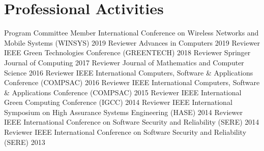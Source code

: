 \section{Professional Activities}
\begin{cvhonors}
  \cvhonor
    {Program Committee Member}
    {International Conference on Wireless Networks and Mobile Systems (WINSYS)}
    {}
    {2019}
  \cvhonor
    {Reviewer}
    {Advances in Computers}
    {}
    {2019}
  \cvhonor
    {Reviewer}
    {IEEE Green Technologies Conference (GREENTECH)}
    {}
    {2018}
  \cvhonor
    {Reviewer}
    {Springer Journal of Computing}
    {}
    {2017}
  \cvhonor
    {Reviewer}
    {Journal of Mathematics and Computer Science}
    {}
    {2016}
  \cvhonor
    {Reviewer}
    {IEEE International Computers, Software \& Applications Conference (COMPSAC)}
    {}
    {2016}
  \cvhonor
    {Reviewer}
    {IEEE International Computers, Software \& Applications Conference (COMPSAC)}
    {}
    {2015}
  \cvhonor
    {Reviewer}
    {IEEE International Green Computing Conference (IGCC)}
    {}
    {2014}
  \cvhonor
    {Reviewer}
    {IEEE International Symposium on High Assurance Systems Engineering (HASE)}
    {}
    {2014}
  \cvhonor
    {Reviewer}
    {IEEE International Conference on Software Security and Reliability (SERE)}
    {}
    {2014}
  \cvhonor
    {Reviewer}
    {IEEE International Conference on Software Security and Reliability (SERE)}
    {}
    {2013}
\end{cvhonors} 